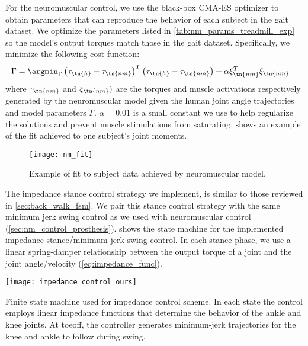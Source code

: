 For the neuromuscular control, we use the black-box CMA-ES optimizer
\citep{hansen2006cma} to obtain parameters that can reproduce the behavior of
each subject in the gait dataset. We optimize the parameters listed in
\cref{tab:nm_params_treadmill_exp} so the model's output torques match those in
the gait dataset. Specifically, we minimize the following cost function:
\begin{align}
    \Gamma &= \argmin_\Gamma \left(\tau_\tn{h} - \tau_\tn{nm} \right)^T
    \left(\tau_\tn{h} - \tau_\tn{nm} \right) + \alpha \xi_\tn{nm}^T \xi_\tn{nm}
\end{align}
where $\tau_\tn{nm}$ and  $\xi_\tn{nm})$ are the torques and muscle activations
respectively generated by the neuromuscular model given the human joint angle
trajectories and model parameters $\Gamma$. $\alpha = 0.01$ is a small constant
we use to help regularize the solutions and prevent muscle stimulations from
saturating.  shows an example of the fit achieved to
one subject's joint moments.
\begin{figure}[b]
    \centering 
    \texttt{[image: nm\_fit]}
    \caption{Example of fit to subject data achieved by neuromuscular
    model.}\label{fig:treadmill_nm_fit}
\end{figure}

The impedance stance control strategy we implement, is similar to those reviewed
in \cref{sec:back_walk_fsm}. We pair this stance control strategy with the same
minimum jerk swing control as we used with neuromuscular control
(\cref{sec:nm_control_prosthesis}).  shows the
state machine for the implemented impedance stance/minimum-jerk swing control.
In each stance phase, we use a linear spring-damper relationship between the
output torque of a joint and the joint angle/velocity
(\cref{eq:impedance_func}).
\begin{marginfigure}
    \centering
    \texttt{[image: impedance\_control\_ours]}
    \caption{Finite state machine used for impedance control scheme. In each
    state the control employs linear impedance functions that determine the
    behavior of the ankle and knee joints. At toeoff, the controller generates
    minimum-jerk trajectories for the knee and ankle to follow during
    swing.}\label{fig:impedance_control_ours}
\end{marginfigure}


